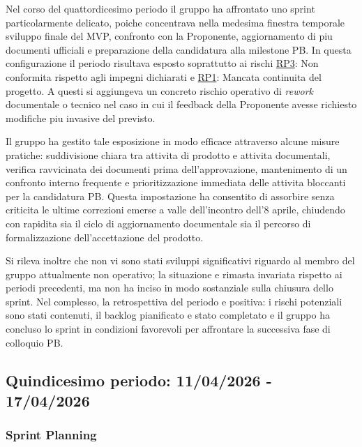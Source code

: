 \documentclass[a4paper, 11pt, oneside]{scrartcl} %
\begin{document}
Nel corso del quattordicesimo periodo il gruppo ha affrontato uno sprint particolarmente delicato, poiche concentrava nella medesima finestra temporale sviluppo finale del MVP, confronto con la Proponente, aggiornamento di piu documenti ufficiali e preparazione della candidatura alla milestone PB. In questa configurazione il periodo risultava esposto soprattutto ai rischi \hyperref[sec:rp3]{RP3}: Non conformita rispetto agli impegni dichiarati e \hyperref[sec:rp1]{RP1}: Mancata continuita del progetto. A questi si aggiungeva un concreto rischio operativo di \textit{rework} documentale o tecnico nel caso in cui il feedback della Proponente avesse richiesto modifiche piu invasive del previsto.

Il gruppo ha gestito tale esposizione in modo efficace attraverso alcune misure pratiche: suddivisione chiara tra attivita di prodotto e attivita documentali, verifica ravvicinata dei documenti prima dell'approvazione, mantenimento di un confronto interno frequente e prioritizzazione immediata delle attivita bloccanti per la candidatura PB. Questa impostazione ha consentito di assorbire senza criticita le ultime correzioni emerse a valle dell'incontro dell'8 aprile, chiudendo con rapidita sia il ciclo di aggiornamento documentale sia il percorso di formalizzazione dell'accettazione del prodotto.

Si rileva inoltre che non vi sono stati sviluppi significativi riguardo al membro del gruppo attualmente non operativo; la situazione e rimasta invariata rispetto ai periodi precedenti, ma non ha inciso in modo sostanziale sulla chiusura dello sprint. Nel complesso, la retrospettiva del periodo e positiva: i rischi potenziali sono stati contenuti, il backlog pianificato e stato completato e il gruppo ha concluso lo sprint in condizioni favorevoli per affrontare la successiva fase di colloquio PB.

\newpage

\subsection{Quindicesimo periodo: 11/04/2026 - 17/04/2026}

\subsubsection*{Sprint Planning}
\end{document}
